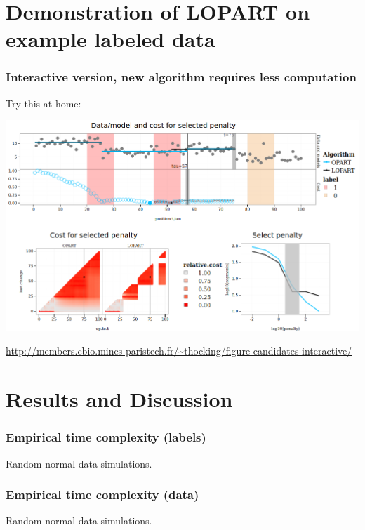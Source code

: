 \documentclass{beamer}
\begin{document}
\section{Demonstration of LOPART on example labeled data}


 
\begin{frame}
  \frametitle{Interactive version, new algorithm requires less computation}
  Try this at home:

  \includegraphics[width=\textwidth]{screenshot-LOPART-interactive}

  \url{http://members.cbio.mines-paristech.fr/~thocking/figure-candidates-interactive/}
\end{frame}

\section{Results and Discussion}

\begin{frame}
  \frametitle{Empirical time complexity (labels)}
  

  Random normal data simulations.
\end{frame}

\begin{frame}
  \frametitle{Empirical time complexity (data)}
  

  Random normal data simulations.
\end{frame}
\end{document}
